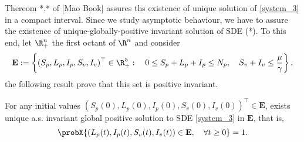 Thereom *.* of [Mao Book] assures ths existence of unique solution of 
\eqref{system_3} in a compact interval. Since we study asymptotic behaviour, 
we have to assure the existence of unique-globally-positive invariant solution 
of SDE (*). To this end, let $\R^n_+$ the first octant of $\R ^ n$ and 
consider  
$$	{
	\mathbf{E}:= 
		\left \{ 
			(S_p, L_p, I_p, S_v, I_v)^{\top} \in \R^5_+: \quad
			0\leq S_p + L_p + I_p \leq N_p, \quad
			S_v + I_v \leq \frac{\mu}{\gamma}
		\right \},
	}
$$
the following result prove that this set is positive invariant.
%
\begin{theorem}\label{existence-unique}
	For any initial values 
	$
		(S_p(0), L_p(0), I_p(0), S_v(0), I_v(0))^{\top}
		\in \mathbf{E}
	$, 
	exists unique a.s. invariant global positive solution to SDE 
	\eqref{system_3} in $\mathbf{E}$, that is,
	\begin{equation*}
		\probX{
			(L_p(t), I_p(t), S_v(t), I_v(t)) 
			\in 
			\mathbf{E}, \quad
			\forall t \geq 0
		} = 1.
	\end{equation*}
\end{theorem}
%
